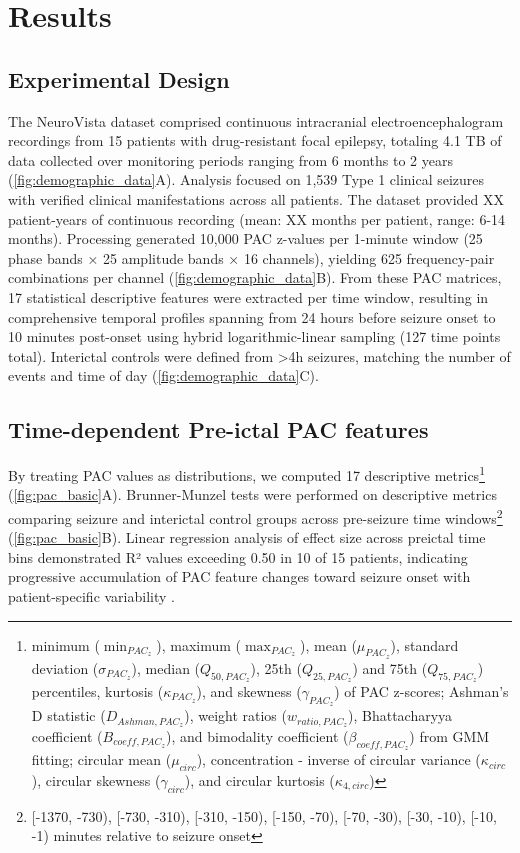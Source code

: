 \section{Results}

\subsection{Experimental Design}
The NeuroVista dataset \cite{Kuhlmann2018SeizurePA} comprised continuous intracranial electroencephalogram recordings from 15 patients with drug-resistant focal epilepsy, totaling 4.1 TB of data collected over monitoring periods ranging from 6 months to 2 years (\ref{fig:demographic_data}A). Analysis focused on 1,539 Type 1 clinical seizures with verified clinical manifestations across all patients. The dataset provided XX patient-years of continuous recording (mean: XX months per patient, range: 6-14 months). Processing generated 10,000 PAC z-values per 1-minute window (25 phase bands × 25 amplitude bands × 16 channels), yielding 625 frequency-pair combinations per channel (\ref{fig:demographic_data}B). From these PAC matrices, 17 statistical descriptive features were extracted per time window, resulting in comprehensive temporal profiles spanning from 24 hours before seizure onset to 10 minutes post-onset using hybrid logarithmic-linear sampling (127 time points total). Interictal controls were defined from >4h seizures, matching the number of events and time of day (\ref{fig:demographic_data}C).

\subsection{Time-dependent Pre-ictal PAC features}
By treating PAC values as distributions, we computed 17 descriptive metrics\footnote{minimum ($\min_{{PAC}_z}$), maximum ($\max_{{PAC}_z}$), mean ($\mu_{{PAC}_z}$), standard deviation ($\sigma_{{PAC}_z}$), median ($Q_{50,{PAC}_z}$), 25th ($Q_{25,{PAC}_z}$) and 75th ($Q_{75,{PAC}_z}$) percentiles, kurtosis ($\kappa_{{PAC}_z}$), and skewness ($\gamma_{{PAC}_z}$) of PAC z-scores; Ashman's D statistic ($D_{Ashman,{PAC}_z}$), weight ratios ($w_{ratio,{PAC}_z}$), Bhattacharyya coefficient ($B_{coeff,{PAC}_z}$), and bimodality coefficient ($\beta_{coeff,{PAC}_z}$) from GMM fitting; circular mean ($\mu_{circ}$), concentration - inverse of circular variance ($\kappa_{circ}$), circular skewness ($\gamma_{circ}$), and circular kurtosis ($\kappa_{4,circ}$)} (\ref{fig:pac_basic}A). Brunner-Munzel tests were performed on descriptive metrics comparing seizure and interictal control groups across pre-seizure time windows\footnote{[-1370, -730), [-730, -310), [-310, -150), [-150, -70), [-70, -30), [-30, -10), [-10, -1) minutes relative to seizure onset} (\ref{fig:pac_basic}B). Linear regression analysis of effect size across preictal time bins demonstrated R² values exceeding 0.50 in 10 of 15 patients, indicating progressive accumulation of PAC feature changes toward seizure onset with patient-specific variability \cite{Kuhlmann2018SeizurePA}.
                  
